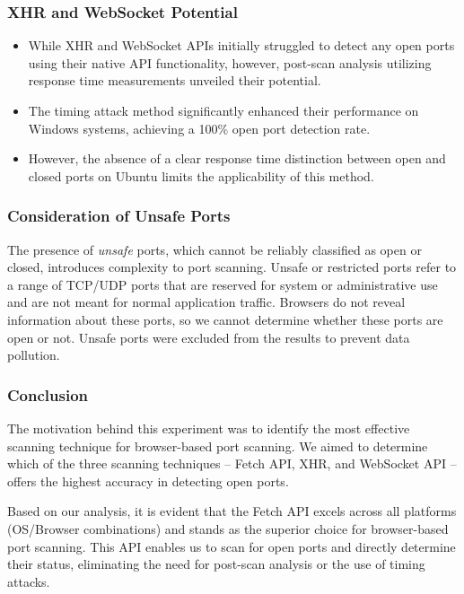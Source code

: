 \subsubsection{XHR and WebSocket Potential}

\begin{itemize}
    \item While XHR and WebSocket APIs initially struggled to detect any open ports using their native API functionality, however, post-scan analysis utilizing response time measurements unveiled their potential.
    \item The timing attack method significantly enhanced their performance on Windows systems, achieving a 100\% open port detection rate.
    \item However, the absence of a clear response time distinction between open and closed ports on Ubuntu limits the applicability of this method.
\end{itemize}

\subsubsection{Consideration of Unsafe Ports}

The presence of \emph{unsafe} ports, which cannot be reliably classified as open or closed, introduces complexity to port scanning.
Unsafe or restricted ports refer to a range of TCP/UDP ports that are reserved for system or administrative use and are not meant for normal application traffic. Browsers do not reveal information about these ports, so we cannot determine whether these ports are open or not. Unsafe ports were excluded from the results to prevent data pollution.


\subsubsection{Conclusion}

The motivation behind this experiment was to identify the most effective scanning technique for browser-based port scanning. We aimed to determine which of the three scanning techniques -- Fetch API, XHR, and WebSocket API -- offers the highest accuracy in detecting open ports.

Based on our analysis, it is evident that the Fetch API excels across all platforms (OS/Browser combinations) and stands as the superior choice for browser-based port scanning. This API enables us to scan for open ports and directly determine their status, eliminating the need for post-scan analysis or the use of timing attacks.


